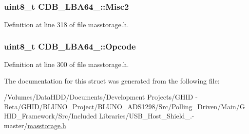 \hypertarget{struct_c_d_b___l_b_a64__16_a9a71353cc6ecb838dfd560a3c985e4a6}{
\subsubsection[{\-Misc2}]{\setlength{\rightskip}{0pt plus 5cm}uint8\-\_\-t {\bf \-C\-D\-B\-\_\-\-L\-B\-A64\-\_\-::\-Misc2}}}\label{struct_c_d_b___l_b_a64__16_a9a71353cc6ecb838dfd560a3c985e4a6}


\-Definition at line 318 of file masstorage.\-h.

\hypertarget{struct_c_d_b___l_b_a64__16_a20868e9b945a51e146af8a31cad92977}{
\subsubsection[{\-Opcode}]{\setlength{\rightskip}{0pt plus 5cm}uint8\-\_\-t {\bf \-C\-D\-B\-\_\-\-L\-B\-A64\-\_\-::\-Opcode}}}\label{struct_c_d_b___l_b_a64__16_a20868e9b945a51e146af8a31cad92977}


\-Definition at line 300 of file masstorage.\-h.



\-The documentation for this struct was generated from the following file\-:\begin{DoxyCompactItemize}
\item 
/\-Volumes/\-Data\-H\-D\-D/\-Documents/\-Development Projects/\-G\-H\-I\-D -\/ Beta/\-G\-H\-I\-D/\-B\-L\-U\-N\-O\-\_\-\-Project/\-B\-L\-U\-N\-O\-\_\-\-A\-D\-S1298/\-Src/\-Polling\-\_\-\-Driven/\-Main/\-G\-H\-I\-D\-\_\-\-Framework/\-Src/\-Included Libraries/\-U\-S\-B\-\_\-\-Host\-\_\-\-Shield\-\_.-\/master/\hyperlink{masstorage_8h}{masstorage.\-h}\end{DoxyCompactItemize}
